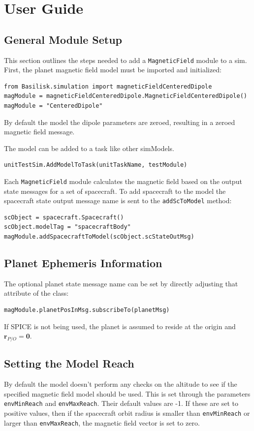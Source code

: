 
\section{User Guide}

\subsection{General Module Setup}
This section outlines the steps needed to add a {\tt MagneticField} module to a sim.
First, the planet magnetic field model must be imported and initialized:
\begin{verbatim}
from Basilisk.simulation import magneticFieldCenteredDipole
magModule = magneticFieldCenteredDipole.MagneticFieldCenteredDipole()
magModule = "CenteredDipole"
\end{verbatim}
By default the model the dipole parameters are zeroed, resulting in a zeroed magnetic field message.

The model can  be added to a task like other simModels.
\begin{verbatim}
unitTestSim.AddModelToTask(unitTaskName, testModule)
\end{verbatim}

Each {\tt MagneticField} module calculates the magnetic field based on the output state messages for a set of spacecraft.
To add spacecraft to the model the spacecraft state output message name is sent to the \verb|addScToModel| method:
\begin{verbatim}
scObject = spacecraft.Spacecraft()
scObject.modelTag = "spacecraftBody"
magModule.addSpacecraftToModel(scObject.scStateOutMsg)
\end{verbatim}

\subsection{Planet Ephemeris Information}
The optional planet state message name can be set by directly adjusting that attribute of the class:
\begin{verbatim}
magModule.planetPosInMsg.subscribeTo(planetMsg)
\end{verbatim}
If SPICE is not being used, the planet is assumed to reside at the origin and $\bm r_{P/O} = \bm 0$.

\subsection{Setting the Model Reach}
By default the model doesn't perform any checks on the altitude to see if the specified magnetic field model should be used.  This is set through the parameters {\tt envMinReach} and {\tt envMaxReach}.  Their default values are -1.  If these are set to positive values, then if the spacecraft orbit radius is smaller than {\tt envMinReach} or larger than {\tt envMaxReach}, the magnetic field vector is set to zero.


